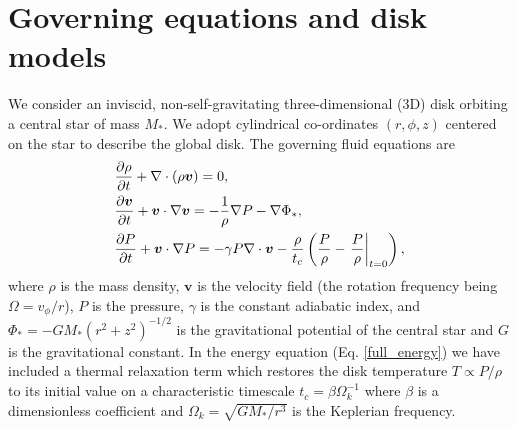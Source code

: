 \section{Governing equations and disk models}\label{setup}
We consider  an inviscid, non-self-gravitating three-dimensional (3D)
disk orbiting a central star of mass $M_*$. We adopt cylindrical
co-ordinates $(r,\phi, z)$ centered on the star to describe the global
disk. The governing fluid equations are
\begin{align}
  &\frac{\partial\rho}{\partial t} + \nabla\cdot{\left(\rho\bm{v}\right)} = 0,\\
  &\frac{\partial\bm{v}}{\partial t} + \bm{v}\cdot\nabla\bm{v} =
  -\frac{1}{\rho}\nabla P - \nabla\Phi_*,\\
  &\frac{\partial P}{\partial t} + \bm{v}\cdot\nabla P  = - \gamma P
  \nabla\cdot\bm{v} - \frac{\rho}{t_c}\left(\frac{P}{\rho} -
    \left.\frac{P}{\rho}\right|_{t=0}\right), \label{full_energy}
\end{align}
where $\rho$ is the mass density, $\bm{v}$ is the velocity field (the
rotation frequency being $\Omega=v_\phi/r$), $P$
is the pressure, $\gamma$ is the constant adiabatic index, and $\Phi_*
= -GM_*(r^2 + z^2)^{-1/2}$ is the gravitational potential of the
central star and $G$ is the gravitational constant. 
In the energy equation (Eq. \ref{full_energy}) we have
included a thermal relaxation term which restores the disk temperature
$T\propto P/\rho$ to its initial value on a characteristic timescale
$t_c=\beta\Omega_k^{-1}$ where $\beta$ is a dimensionless coefficient
and $\Omega_k=\sqrt{GM_*/r^3}$ is the Keplerian frequency. 

